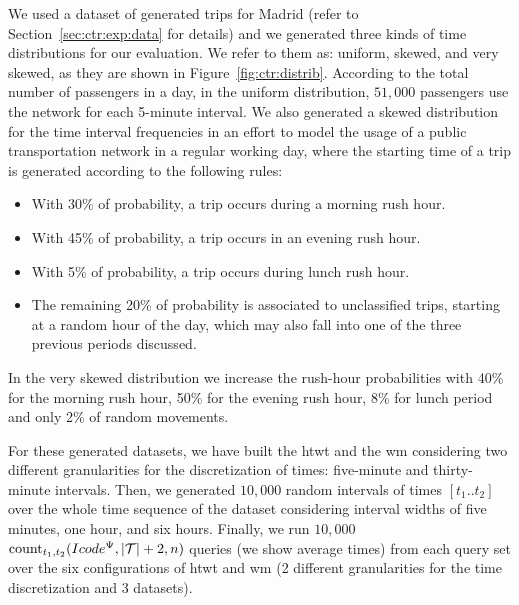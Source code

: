 	We used a dataset of generated trips for Madrid (refer to Section~\ref{sec:ctr:exp:data} for details) and we
	generated three kinds of time distributions for our evaluation. We refer to them as: uniform, skewed, and very skewed, as they are shown
	in Figure~\ref{fig:ctr:distrib}. 
	According to the total number of passengers in a day, in the uniform distribution, $51,\!000$ passengers 
	use the network for each 5-minute interval. 
	We also generated a skewed distribution for the time interval frequencies in an effort to
	model the usage of a public transportation network in a regular working day, where the starting time of a trip
	is generated according to the following rules:
	\begin{itemize}
		\item With 30\% of probability, a trip occurs during a morning rush hour.
		\item With 45\% of probability, a trip occurs in an evening rush hour.
		\item With 5\% of probability, a trip occurs during lunch rush hour.
		\item The remaining 20\% of probability is associated to unclassified trips, starting at a random hour of the day, which may also fall into one of the three previous periods discussed.
	\end{itemize}
	In the very skewed distribution we increase the rush-hour probabilities with
	40\% for the morning rush hour, 50\% for the evening rush hour, 8\% for lunch period and only
	2\% of random movements.
	\medskip

	For these generated datasets, we have built the \gls{htwt} and the \gls{wm} considering two different granularities for the discretization of times: 
	five-minute and thirty-minute intervals. Then, we generated $10,\!000$ random intervals of times $[t_1..t_2]$ over the whole 
	time sequence of the dataset considering interval widths of five minutes, one hour, and six hours.  
	Finally, we run $10,\!000$  $\operatorname{count}_{t_1,t_2}(Icode^{\Psi},|\mathcal{T}|+2,n)$ queries (we show average times) from each query set over 
	the six configurations of \gls{htwt} and \gls{wm}  
	(2 different granularities for the time discretization and 3 datasets).



